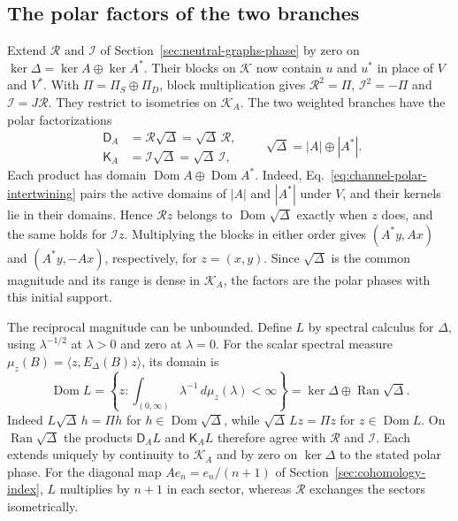 \documentclass[11pt]{article}
\theoremstyle{definition}
\DeclareMathOperator{\Ran}{Ran}
\begin{document}
\subsection{The polar factors of the two branches}
Extend $\mathcal R$ and $\mathcal I$ of Section~\ref{sec:neutral-graphs-phase} by zero on $\ker\Delta=\ker A\oplus\ker A^*$. Their blocks on $\mathcal K$ now contain $u$ and $u^*$ in place of $V$ and $V^*$. With $\Pi=\Pi_S\oplus\Pi_D$, block multiplication gives $\mathcal R^2=\Pi$, $\mathcal I^2=-\Pi$ and $\mathcal I=J\mathcal R$. They restrict to isometries on $\mathcal K_A$. The two weighted branches have the polar factorizations
\begin{equation}
 \begin{aligned}
 \mathsf D_A&=\mathcal R\sqrt\Delta=\sqrt\Delta\,\mathcal R,\\
 \mathsf K_A&=\mathcal I\sqrt\Delta=\sqrt\Delta\,\mathcal I ,
 \end{aligned}
 \qquad
 \sqrt\Delta=|A|\oplus|A^*| .
 \label{eq:branch-polar-factorization}
\end{equation}
Each product has domain $\operatorname{Dom}A\oplus\operatorname{Dom}A^*$. Indeed, Eq.~\eqref{eq:channel-polar-intertwining} pairs the active domains of $|A|$ and $|A^*|$ under $V$, and their kernels lie in their domains. Hence $\mathcal Rz$ belongs to $\operatorname{Dom}\sqrt\Delta$ exactly when $z$ does, and the same holds for $\mathcal I z$. Multiplying the blocks in either order gives $(A^*y,Ax)$ and $(A^*y,-Ax)$, respectively, for $z=(x,y)$. Since $\sqrt\Delta$ is the common magnitude and its range is dense in $\mathcal K_A$, the factors are the polar phases with this initial support.

The reciprocal magnitude can be unbounded. Define $L$ by spectral calculus for $\Delta$, using $\lambda^{-1/2}$ at $\lambda>0$ and zero at $\lambda=0$. For the scalar spectral measure $\mu_z(B)=\langle z,E_\Delta(B)z\rangle$, its domain is
\begin{equation}
 \operatorname{Dom}L
 =\left\{z:\int_{(0,\infty)}\lambda^{-1}\,d\mu_z(\lambda)<\infty\right\}
 =\ker\Delta\oplus\Ran\sqrt\Delta .
 \label{eq:inverse-phase-domain}
\end{equation}
Indeed $L\sqrt\Delta\,h=\Pi h$ for $h\in\operatorname{Dom}\sqrt\Delta$, while $\sqrt\Delta\,Lz=\Pi z$ for $z\in\operatorname{Dom}L$. On $\Ran\sqrt\Delta$ the products $\mathsf D_A L$ and $\mathsf K_A L$ therefore agree with $\mathcal R$ and $\mathcal I$. Each extends uniquely by continuity to $\mathcal K_A$ and by zero on $\ker\Delta$ to the stated polar phase. For the diagonal map $Ae_n=e_n/(n+1)$ of Section~\ref{sec:cohomology-index}, $L$ multiplies by $n+1$ in each sector, whereas $\mathcal R$ exchanges the sectors isometrically.
\end{document}
